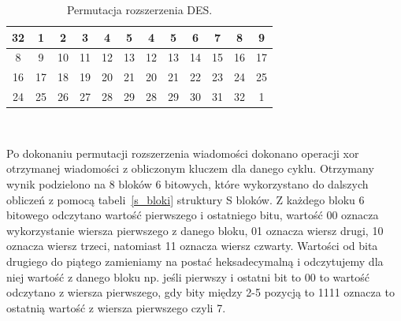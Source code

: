 \documentclass[12p]{article}
\begin{document}
\begin{table}[H]
\centering
\begin{tabular}{|c|c|c|c|c|c|c|c|c|c|c|c|}
\hline
32 & 1 & 2 & 3 & 4 & 5 & 4 & 5 & 6 & 7 & 8 & 9\\
\hline
8 & 9 & 10 & 11 & 12 & 13 & 12 & 13 & 14 & 15 & 16 & 17\\
\hline
16 & 17 & 18 & 19 & 20 & 21 & 20 & 21 & 22 & 23 & 24 & 25\\
\hline
24 & 25 & 26 & 27 & 28 & 29 & 28 & 29 & 30 & 31 & 32 & 1\\
\hline
\end{tabular}
\caption{Permutacja rozszerzenia DES.}~\label{per_rozszerzenia}
\end{table}

Po dokonaniu permutacji rozszerzenia wiadomości dokonano operacji xor otrzymanej wiadomości z obliczonym kluczem dla danego cyklu. Otrzymany wynik podzielono na 8 bloków 6 bitowych, które wykorzystano do dalszych obliczeń z pomocą tabeli~\ref{s_bloki} struktury S bloków. Z każdego bloku 6 bitowego odczytano wartość pierwszego i ostatniego bitu, wartość 00 oznacza wykorzystanie wiersza pierwszego z danego bloku, 01 oznacza wiersz drugi, 10 oznacza wiersz trzeci, natomiast 11 oznacza wiersz czwarty. Wartości od bita drugiego do piątego zamieniamy na postać heksadecymalną i odczytujemy dla niej wartość z danego bloku np. jeśli pierwszy i ostatni bit to 00 to wartość odczytano z wiersza pierwszego, gdy bity między 2-5 pozycją to 1111 oznacza to ostatnią wartość z wiersza pierwszego czyli 7.
\end{document}
